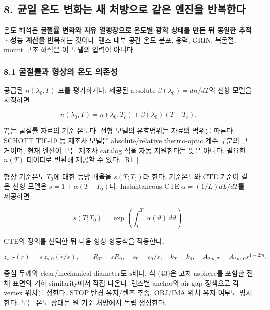 \documentclass[
  a4paper,
]{article}
\begin{document}
\hypertarget{uxade0uxc77c-uxc628uxb3c4-uxbcc0uxd654uxb294-uxc0c8-uxcc98uxbc29uxc73cuxb85c-uxac19uxc740-uxc5d4uxc9c4uxc744-uxbc18uxbcf5uxd55cuxb2e4}{%
\subsection{8. 균일 온도 변화는 새 처방으로 같은 엔진을
반복한다}\label{uxade0uxc77c-uxc628uxb3c4-uxbcc0uxd654uxb294-uxc0c8-uxcc98uxbc29uxc73cuxb85c-uxac19uxc740-uxc5d4uxc9c4uxc744-uxbc18uxbcf5uxd55cuxb2e4}}

온도 해석은 \textbf{굴절률 변화와 자유 열팽창으로 온도별 광학 상태를
만든 뒤 동일한 추적·성능 계산을 반복}하는 것이다. 렌즈 내부 공간 온도
분포, 응력, GRIN, 복굴절, mount 구조 해석은 이 모델의 입력이 아니다.

\hypertarget{uxad74uxc808uxb960uxacfc-uxd615uxc0c1uxc758-uxc628uxb3c4-uxc758uxc874uxc131}{%
\subsubsection{8.1 굴절률과 형상의 온도
의존성}\label{uxad74uxc808uxb960uxacfc-uxd615uxc0c1uxc758-uxc628uxb3c4-uxc758uxc874uxc131}}

공급된 \(n(\lambda_0,T)\) 표를 평가하거나, 제공된 absolute
\(\beta(\lambda_0)=dn/dT\)의 선형 모델을 지정하면

\[
n(\lambda_0,T)=n(\lambda_0,T_c)+\beta(\lambda_0)(T-T_c).
\tag{41}
\]

\(T_c\)는 굴절률 자료의 기준 온도다. 선형 모델의 유효범위는 자료의
범위를 따른다. SCHOTT TIE-19 등 제조사 모델은 absolute/relative
thermo-optic 계수 구분의 근거이며, 현재 엔진이 모든 제조사 catalog 식을
자동 지원한다는 뜻은 아니다. 필요한 \(n(T)\) 데이터로 변환해 제공할 수
있다. {[}R11{]}

형상 기준온도 \(T_0\)에 대한 등방 배율을 \(s(T;T_0)\)라 한다. 기준온도와
CTE 기준이 같은 선형 모델은 \(s=1+\alpha(T-T_0)\)다. Instantaneous CTE
\(\alpha=(1/L)dL/dT\)를 제공하면

\[
s(T;T_0)=\exp\left(\int_{T_0}^{T}\alpha(\vartheta)\,d\vartheta\right).
\tag{42}
\]

CTE의 정의를 선택한 뒤 다음 형상 항등식을 적용한다.

\[
z_{s,T}(r)=s\,z_{s,0}(r/s),\qquad
R_T=sR_0,\quad c_T=c_0/s,\quad k_T=k_0,
\quad A_{2m,T}=A_{2m,0}s^{1-2m}.
\tag{43}
\]

중심 두께와 clear/mechanical diameter도 \(s\)배다. 식 (43)은 고차
asphere를 포함한 전체 표면의 기하 similarity에서 직접 나온다. 렌즈별
anchor와 air gap 정책으로 각 vertex 위치를 정한다. STOP 반경 유지/렌즈
추종, OBJ/IMA 위치 유지 여부도 명시한다. 모든 온도 상태는 원 기준
처방에서 독립 생성한다.
\end{document}
